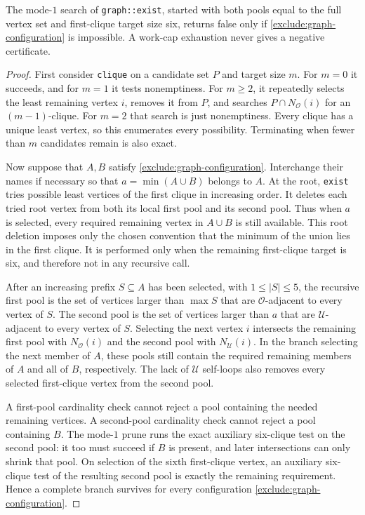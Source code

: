 \begin{lemma}
\label{exclude:graph-search}
The mode-$1$ search of \texttt{graph::exist}, started with both pools
equal to the full vertex set and first-clique target size six, returns
false only if \eqref{exclude:graph-configuration} is impossible.
A work-cap exhaustion never gives a negative certificate.
\end{lemma}
\begin{proof}
First consider \texttt{clique} on a candidate set $P$ and target size
$m$.  For $m=0$ it succeeds, and for $m=1$ it tests nonemptiness.
For $m\ge2$, it repeatedly selects the least remaining vertex $i$,
removes it from $P$, and searches $P\cap N_{\mathcal O}(i)$ for an
$(m-1)$-clique.  For $m=2$ that search is just nonemptiness.
Every clique has a unique least vertex, so this enumerates every
possibility.  Terminating when fewer than $m$ candidates remain is
also exact.

Now suppose that $A,B$ satisfy \eqref{exclude:graph-configuration}.
Interchange their names if necessary so that
$a=\min(A\cup B)$ belongs to $A$.
At the root, \texttt{exist} tries possible least vertices of the
first clique in increasing order.  It deletes each tried root vertex
from both its local first pool and its second pool.  Thus when $a$
is selected, every required remaining vertex in $A\cup B$ is still
available.  This root deletion imposes only the chosen convention
that the minimum of the union lies in the first clique.  It is
performed only when the remaining first-clique target is six,
and therefore not in any recursive call.

After an increasing prefix $S\subseteq A$ has been selected, with
$1\le|S|\le5$, the recursive first pool is the set of vertices larger
than $\max S$ that are $\mathcal O$-adjacent to every vertex of $S$.
The second pool is the set of vertices larger than $a$ that are
$\mathcal U$-adjacent to every vertex of $S$.
Selecting the next vertex $i$ intersects the remaining first pool
with $N_{\mathcal O}(i)$ and the second pool with
$N_{\mathcal U}(i)$.  In the branch selecting the next member of $A$,
these pools still contain the required remaining members of $A$ and
all of $B$, respectively.
The lack of $\mathcal U$ self-loops also removes every selected
first-clique vertex from the second pool.

A first-pool cardinality check cannot reject a pool containing the
needed remaining vertices.  A second-pool cardinality check cannot
reject a pool containing $B$.
The mode-$1$ prune runs the exact auxiliary six-clique test on the
second pool: it too must succeed if $B$ is present, and later
intersections can only shrink that pool.  On selection of the sixth
first-clique vertex, an auxiliary six-clique test of the resulting
second pool is exactly the remaining requirement.
Hence a complete branch survives for every configuration
\eqref{exclude:graph-configuration}.


\end{proof}
